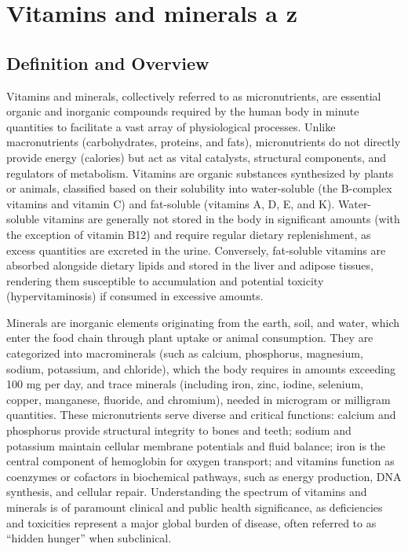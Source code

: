 \chapter{Vitamins and minerals a z}

\section*{Definition and Overview}
Vitamins and minerals, collectively referred to as micronutrients, are essential organic and inorganic compounds required by the human body in minute quantities to facilitate a vast array of physiological processes. Unlike macronutrients (carbohydrates, proteins, and fats), micronutrients do not directly provide energy (calories) but act as vital catalysts, structural components, and regulators of metabolism. Vitamins are organic substances synthesized by plants or animals, classified based on their solubility into water-soluble (the B-complex vitamins and vitamin C) and fat-soluble (vitamins A, D, E, and K). Water-soluble vitamins are generally not stored in the body in significant amounts (with the exception of vitamin B12) and require regular dietary replenishment, as excess quantities are excreted in the urine. Conversely, fat-soluble vitamins are absorbed alongside dietary lipids and stored in the liver and adipose tissues, rendering them susceptible to accumulation and potential toxicity (hypervitaminosis) if consumed in excessive amounts.

Minerals are inorganic elements originating from the earth, soil, and water, which enter the food chain through plant uptake or animal consumption. They are categorized into macrominerals (such as calcium, phosphorus, magnesium, sodium, potassium, and chloride), which the body requires in amounts exceeding 100 mg per day, and trace minerals (including iron, zinc, iodine, selenium, copper, manganese, fluoride, and chromium), needed in microgram or milligram quantities. These micronutrients serve diverse and critical functions: calcium and phosphorus provide structural integrity to bones and teeth; sodium and potassium maintain cellular membrane potentials and fluid balance; iron is the central component of hemoglobin for oxygen transport; and vitamins function as coenzymes or cofactors in biochemical pathways, such as energy production, DNA synthesis, and cellular repair. Understanding the spectrum of vitamins and minerals is of paramount clinical and public health significance, as deficiencies and toxicities represent a major global burden of disease, often referred to as ``hidden hunger'' when subclinical.

